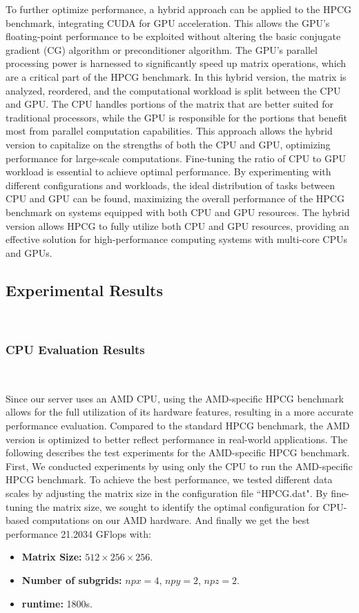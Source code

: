 To further optimize performance, a hybrid approach can be applied to the HPCG benchmark, integrating CUDA for GPU acceleration. 
This allows the GPU’s floating-point performance to be exploited without altering the basic conjugate gradient (CG) algorithm or preconditioner algorithm.
The GPU’s parallel processing power is harnessed to significantly speed up matrix operations, which are a critical part of the HPCG benchmark.
In this hybrid version, the matrix is analyzed, reordered, and the computational workload is split between the CPU and GPU. 
The CPU handles portions of the matrix that are better suited for traditional processors, while the GPU is responsible for the portions that benefit most from parallel computation capabilities. 
This approach allows the hybrid version to capitalize on the strengths of both the CPU and GPU, optimizing performance for large-scale computations.
Fine-tuning the ratio of CPU to GPU workload is essential to achieve optimal performance. 
By experimenting with different configurations and workloads, the ideal distribution of tasks between
CPU and GPU can be found, maximizing the overall performance of the HPCG benchmark on systems equipped with both CPU and GPU resources.
The hybrid version allows HPCG to fully utilize both CPU and GPU resources, providing an effective solution for high-performance computing systems with multi-core CPUs and GPUs.


\subsection{Experimental Results}
\ 


\subsubsection{CPU Evaluation Results}
\ 

Since our server uses an AMD CPU, using the AMD-specific HPCG benchmark allows for the full utilization of its hardware features, resulting in a more accurate performance evaluation. 
Compared to the standard HPCG benchmark, the AMD version is optimized to better reflect performance in real-world applications. 
The following describes the test experiments for the AMD-specific
HPCG benchmark.
First, We conducted experiments by using only the CPU to run the AMD-specific HPCG benchmark. 
To achieve the best performance, we tested different data scales by adjusting the matrix size in the configuration file ``HPCG.dat".
By fine-tuning the matrix size, we sought to identify the optimal configuration for CPU-based computations on our AMD hardware.
And finally we get the best performance 21.2034 GFlops with:
\begin{itemize}
    \item \textbf{Matrix Size:} $512{\times}256{\times}256$.
    \item \textbf{Number of subgrids:} $npx{=}4$, $npy{=}2$, $npz{=}2$.
    \item \textbf{runtime:} 1800s.
\end{itemize}

